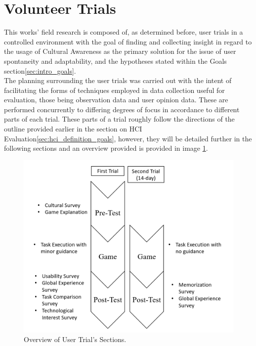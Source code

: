 \section{Volunteer Trials} \label{sec:develop_trials}
    This works’ field research is composed of, as determined before, user trials in a controlled environment with the goal of finding and collecting insight in regard to the usage of Cultural Awareness as the primary solution for the issue of user spontaneity and adaptability, and the hypotheses stated within the Goals section\ref{sec:intro_goals}.\\
    The planning surrounding the user trials was carried out with the intent of facilitating the forms of techniques employed in data collection useful for evaluation, those being observation data and user opinion data. These are performed concurrently to differing degrees of focus in accordance to different parts of each trial. These parts of a trial roughly follow the directions of the outline provided earlier in the section on HCI Evaluation\ref{sec:hci_definition_goals}, however, they will be detailed further in the following sections and an overview provided is provided in image \ref{fig:FigureTrialSections}.
    
    \begin{figure}[ht]
        \hspace*{-1cm}
        \centering                                                
        \includegraphics[width=.9\paperwidth]{figures/TrialSections.png}
        \caption{\label{fig:FigureTrialSections}Overview of User Trial's Sections.}               
    \end{figure}
    
